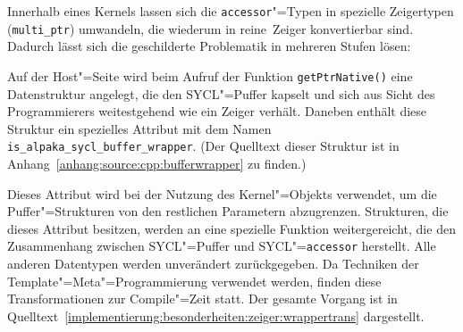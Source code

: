 Innerhalb eines Kernels lassen sich die \texttt{accessor}"=Typen in spezielle
Zeigertypen (\texttt{multi\_ptr}) umwandeln, die wiederum in \glqq reine\grqq\
Zeiger konvertierbar sind. Dadurch lässt sich die geschilderte Problematik in
mehreren Stufen lösen:

Auf der Host"=Seite wird beim Aufruf der Funktion \texttt{getPtrNative()} eine
Datenstruktur angelegt, die den SYCL"=Puffer kapselt und sich aus Sicht des
Programmierers weitestgehend wie ein Zeiger verhält. Daneben enthält diese
Struktur ein spezielles Attribut mit dem Namen
\texttt{is\_alpaka\_sycl\_buffer\_wrapper}. (Der Quelltext dieser Struktur ist
in Anhang~\ref{anhang:source:cpp:bufferwrapper} zu finden.)

Dieses Attribut wird bei der Nutzung des Kernel"=Objekts verwendet, um die
Puffer"=Strukturen von den restlichen Parametern abzugrenzen. Strukturen, die
dieses Attribut besitzen, werden an eine spezielle Funktion weitergereicht, die
den Zusammenhang zwischen SYCL"=Puffer und SYCL"=\texttt{accessor} herstellt.
Alle anderen Datentypen werden unverändert zurückgegeben. Da Techniken der
Template"=Meta"=Programmierung verwendet werden, finden diese Transformationen
zur Compile"=Zeit statt. Der gesamte Vorgang ist in
Quelltext~\ref{implementierung:besonderheiten:zeiger:wrappertrans} dargestellt.

